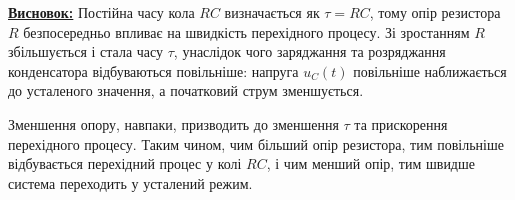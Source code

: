 \documentclass[12pt,a4paper]{article}
\begin{document}
    \vspace{1em}

    \noindent
    \textbf{\underline{Висновок:}} Постійна часу кола $RC$ визначається як $\tau = RC$, тому опір резистора $R$ безпосередньо впливає 
    на швидкість перехідного процесу. Зі зростанням $R$ збільшується і стала часу $\tau$, унаслідок чого 
    заряджання та розряджання конденсатора відбуваються повільніше: напруга $u_C(t)$ повільніше 
    наближається до усталеного значення, а початковий струм зменшується. 

    Зменшення опору, навпаки, призводить до зменшення $\tau$ та прискорення перехідного процесу. 
    Таким чином, чим більший опір резистора, тим повільніше відбувається перехідний процес у колі $RC$, 
    і чим менший опір, тим швидше система переходить у усталений режим.
\end{document}
